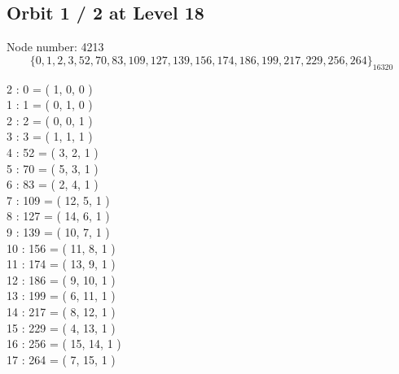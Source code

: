 \subsection*{Orbit 1 / 2 at Level 18}
Node number: 4213\\
$$
\{ 0, 1, 2, 3, 52, 70, 83, 109, 127, 139, 156, 174, 186, 199, 217, 229, 256, 264 \}_{16320}$$
\begin{multicols}{2}
 : 0 = ( 1, 0, 0 )\\
1 : 1 = ( 0, 1, 0 )\\
2 : 2 = ( 0, 0, 1 )\\
3 : 3 = ( 1, 1, 1 )\\
4 : 52 = ( 3, 2, 1 )\\
5 : 70 = ( 5, 3, 1 )\\
6 : 83 = ( 2, 4, 1 )\\
7 : 109 = ( 12, 5, 1 )\\
8 : 127 = ( 14, 6, 1 )\\
9 : 139 = ( 10, 7, 1 )\\
10 : 156 = ( 11, 8, 1 )\\
11 : 174 = ( 13, 9, 1 )\\
12 : 186 = ( 9, 10, 1 )\\
13 : 199 = ( 6, 11, 1 )\\
14 : 217 = ( 8, 12, 1 )\\
15 : 229 = ( 4, 13, 1 )\\
16 : 256 = ( 15, 14, 1 )\\
17 : 264 = ( 7, 15, 1 )\\
\end{multicols}
